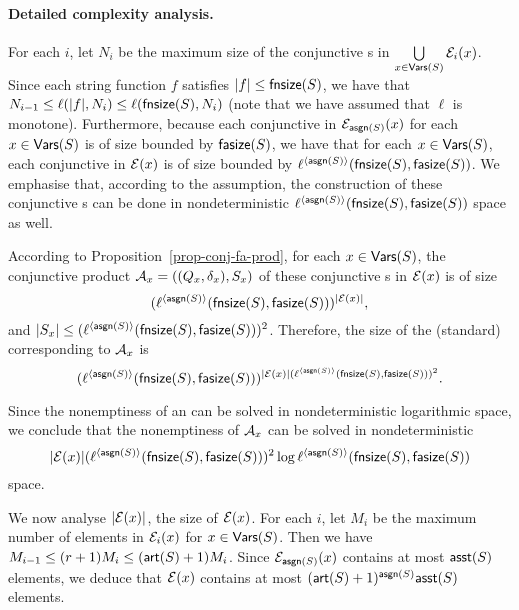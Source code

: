 \paragraph{Detailed complexity analysis.}
For each $i$, 
let $N_i$ be the maximum size of the conjunctive \FA{}s in $\bigcup \limits_{x \in \mathsf{Vars}(S)} \mathcal{E}_i(x)$.
Since each string function $f$ satisfies $|f| \le \mathsf{fnsize}(S)$, we have that $N_{i-1} \le \ell(|f|, N_i) \le \ell(\mathsf{fnsize}(S), N_i)$ (note that we have assumed that $\ell$ is monotone). Furthermore, because each conjunctive \FA{} in $\mathcal{E}_{\mathsf{asgn}(S)}(x)$ for each $x \in \mathsf{Vars}(S)$ is of size bounded by $\mathsf{fasize}(S)$, we have that for each $x \in \mathsf{Vars}(S)$, each conjunctive \FA{} in $\mathcal{E}(x)$ is of size bounded by $\ell^{\langle \mathsf{asgn}(S) \rangle}(\mathsf{fnsize}(S), \mathsf{fasize}(S))$. 
%
We emphasise that, according to the \prerec{} assumption, the construction of these conjunctive \FA{}s can be done in nondeterministic $\ell^{\langle \mathsf{asgn}(S) \rangle}(\mathsf{fnsize}(S), \mathsf{fasize}(S))$ space as well. 

According to Proposition~\ref{prop-conj-fa-prod}, for each $x \in \mathsf{Vars}(S)$, the conjunctive product \FA{} $\mathcal{A}_x=((Q_x, \delta_x), S_x)$ of these conjunctive \FA{}s  in $\mathcal{E}(x)$ is of size 
$$(\ell^{\langle \mathsf{asgn}(S) \rangle}(\mathsf{fnsize}(S), \mathsf{fasize}(S)))^{|\mathcal{E}(x)|},$$
and $|S_x| \le (\ell^{\langle \mathsf{asgn}(S) \rangle}(\mathsf{fnsize}(S), \mathsf{fasize}(S)))^2$. Therefore, the size of the (standard) \FA{} corresponding to $\mathcal{A}_x$ is 
$$(\ell^{\langle \mathsf{asgn}(S) \rangle}(\mathsf{fnsize}(S), \mathsf{fasize}(S)))^{|\mathcal{E}(x)| (\ell^{\langle \mathsf{asgn}(S) \rangle}(\mathsf{fnsize}(S), \mathsf{fasize}(S)))^2}.$$

Since the nonemptiness of an \FA{} can be solved in nondeterministic logarithmic space, we conclude that the nonemptiness of $\mathcal{A}_x$ can be solved in nondeterministic
{\small
$$|\mathcal{E}(x)| (\ell^{\langle \mathsf{asgn}(S) \rangle}(\mathsf{fnsize}(S), \mathsf{fasize}(S)))^2 \log \ell^{\langle \mathsf{asgn}(S) \rangle}(\mathsf{fnsize}(S), \mathsf{fasize}(S))$$
}
space.

We now analyse $|\mathcal{E}(x)|$, the size of $\mathcal{E}(x)$.
For each $i$, let $M_i$ be the maximum number of elements in $\mathcal{E}_i(x)$ for $x  \in \mathsf{Vars}(S)$.
Then we have $M_{i-1} \le (r+1)M_i \le (\mathsf{art}(S)+1)M_i $. Since $\mathcal{E}_{\mathsf{asgn}(S)}(x)$ contains at most $\mathsf{asst}(S)$ elements, we deduce that $\mathcal{E}(x)$ contains at most $(\mathsf{art}(S)+1)^{\mathsf{asgn}(S)}\mathsf{asst}(S)$ elements. 

